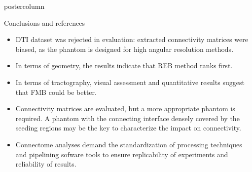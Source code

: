 \documentclass[final,hyperref={pdfpagelabels=false}]{beamer}
\newlength{\columnheight}
\begin{document}
\begin{frame}[t]
{\begin{minipage}[t][\columnheight][c]{0.95\textwidth}
{\begin{columns}[T,totalwidth=\textwidth]
    \begin{column}{.64\textwidth}
      \begin{beamercolorbox}[center,wd=\textwidth]{postercolumn}
        \begin{minipage}[T]{.95\textwidth} %
          \parbox[t]{\textwidth}{ %
          \begin{block}{Conclusions and references}
            \begin{itemize}
              \item DTI dataset was rejected in evaluation: extracted
                    connectivity matrices were biased, as the phantom
                    is designed for high angular resolution methods.
              \item In terms of geometry, the results indicate
                    that REB method ranks first.
              \item In terms of tractography, visual assessment and
                    quantitative results suggest that FMB could be
                    better.
              \item Connectivity matrices are evaluated, but a more appropriate
                    phantom is required. A phantom with the connecting interface
                    densely covered by the seeding regions may be the key
                    to characterize the impact on connectivity.
              \item Connectome analyses demand the standardization of
                    processing techniques and pipelining sofware tools to
                    ensure replicability of experiments and reliability of
                    results.
            \end{itemize}


\end{block}}
\end{minipage}
\end{beamercolorbox}
\end{column}
\end{columns}}
\end{minipage}}
\end{frame}
\end{document}
